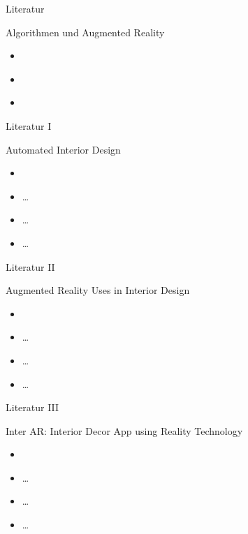 \documentclass[presentation,bigger,aspectratio=169]{beamer}
\begin{document}
\begin{frame}[label={sec:orgf00bd3a}]{Literatur}
\begin{block}{Algorithmen und Augmented Reality}
\begin{itemize}
\item \textcite{kanAutomatedInteriorDesign2017}
\item \textcite{sanduAugmentedRealityUses2018}
\item \textcite{moaresInterARInterior2020}
\end{itemize}
\end{block}
\end{frame}

\begin{frame}[label={sec:org71fd9d7}]{Literatur I}
\begin{block}{Automated Interior Design}
\begin{itemize}
\item \textcite{kanAutomatedInteriorDesign2017}
\item \ldots{}
\item \ldots{}
\item \ldots{}
\end{itemize}
\end{block}
\end{frame}

\begin{frame}[label={sec:org6b10ae8}]{Literatur II}
\begin{block}{Augmented Reality Uses in Interior Design}
\begin{itemize}
\item \textcite{sanduAugmentedRealityUses2018}
\item \ldots{}
\item \ldots{}
\item \ldots{}
\end{itemize}
\end{block}
\end{frame}

\begin{frame}[label={sec:orgf8bc05e}]{Literatur III}
\begin{block}{Inter AR: Interior Decor App using Reality Technology}
\begin{itemize}
\item \textcite{moaresInterARInterior2020}
\item \ldots{}
\item \ldots{}
\item \ldots{}
\end{itemize}
\end{block}
\end{frame}
\end{document}
